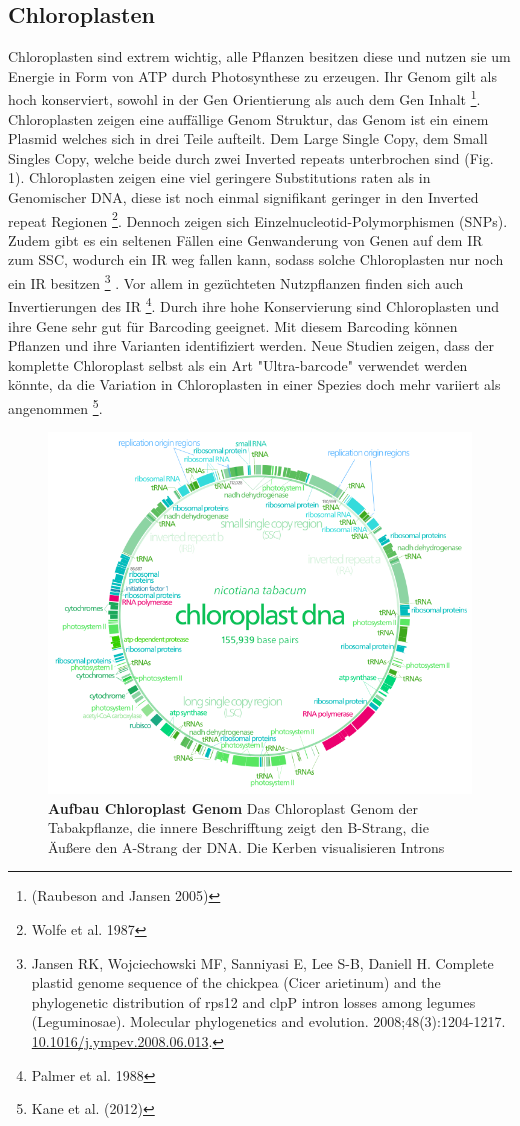 \documentclass{scrartcl}
\begin{document}
\subsection{Chloroplasten}
\label{sec-1-1}
Chloroplasten sind extrem wichtig, alle Pflanzen besitzen diese und nutzen sie um Energie in Form von ATP durch Photosynthese zu erzeugen.
Ihr Genom gilt als hoch konserviert, sowohl in der Gen Orientierung als auch dem Gen Inhalt \footnote{(Raubeson and Jansen 2005)}. Chloroplasten zeigen
eine auffällige Genom Struktur, das Genom ist ein einem Plasmid welches sich in drei Teile aufteilt. Dem Large Single Copy, dem 
Small Singles Copy, welche beide durch zwei Inverted repeats unterbrochen sind (Fig. 1). Chloroplasten zeigen eine viel geringere Substitutions raten
als in Genomischer DNA, diese ist noch einmal signifikant geringer in den Inverted repeat Regionen \footnote{Wolfe et al. 1987}. Dennoch zeigen sich
Einzelnucleotid-Polymorphismen (SNPs). Zudem gibt es ein seltenen Fällen eine Genwanderung von Genen auf dem IR zum SSC, wodurch ein IR weg
fallen kann, sodass solche Chloroplasten nur noch ein IR besitzen \footnote{Jansen RK, Wojciechowski MF, Sanniyasi E, Lee S-B, Daniell H. Complete plastid genome sequence of the chickpea (Cicer arietinum) and the phylogenetic distribution of rps12 and clpP intron losses among legumes (Leguminosae). Molecular phylogenetics and evolution. 2008;48(3):1204-1217. \url{10.1016/j.ympev.2008.06.013}.} . Vor allem in gezüchteten Nutzpflanzen finden sich auch 
Invertierungen des IR \footnote{Palmer et al. 1988}. Durch ihre hohe Konservierung sind Chloroplasten und ihre Gene sehr gut für Barcoding geeignet. Mit diesem
Barcoding können Pflanzen und ihre Varianten identifiziert werden. Neue Studien zeigen, dass der komplette Chloroplast selbst als ein Art "Ultra-barcode"
verwendet werden könnte, da die Variation in Chloroplasten in einer Spezies doch mehr variiert als angenommen \footnote{Kane et al. (2012)}. 
\begin{figure}
\includegraphics[width=.9\linewidth]{./703px-CtDNA.png}
\caption[Aufbau Chloroplast Genom]{\textbf{Aufbau Chloroplast Genom} Das Chloroplast Genom der Tabakpflanze, die innere Beschrifftung zeigt den B-Strang, die Äußere den A-Strang der DNA. Die Kerben visualisieren Introns}
\end{figure}
\end{document}

